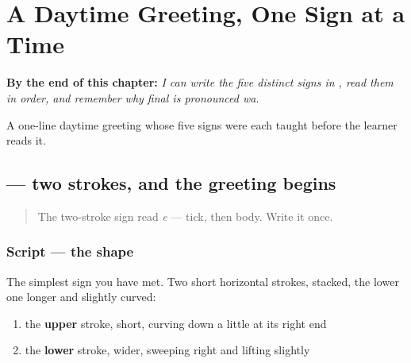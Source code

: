 
\chapter{A Daytime Greeting, One Sign at a Time}
\label{ch:ja-daytime-greeting}

\begin{chapteropening}
\textbf{By the end of this chapter:} \emph{I can write the five distinct signs in , read them in order, and remember why final  is pronounced wa.}

A one-line daytime greeting whose five signs were each taught before the learner reads it.
\end{chapteropening}

\section[\texorpdfstring{\ja{こ} (ko)}{こ (ko)}]{ — two strokes, and the greeting begins}

\label{lesson:JA-W01-ko}



\begin{quote}
The two-stroke sign read \emph{e} — tick, then body. Write it once.
\end{quote}

\subsection*{Script — the shape}

\begin{quote}
\end{quote}

The simplest sign you have met. Two short horizontal strokes, stacked, the lower one longer and slightly curved:

\begin{enumerate}
\raggedright
  \item the \textbf{upper} stroke, short, curving down a little at its right end
  \item the \textbf{lower} stroke, wider, sweeping right and lifting slightly
\end{enumerate}

